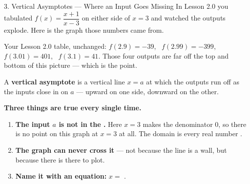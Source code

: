 \documentclass[10pt]{article}
\begin{document}
\boxguard[30]
\begin{notesbox}{3. Vertical Asymptotes --- Where an Input Goes Missing}
\small
In Lesson 2.0 you tabulated $f(x)=\dfrac{x+1}{x-3}$ on either side of $x=3$ and watched the outputs
explode. Here is the graph those numbers came from.

\begin{center}
\end{center}

\vspace{-4pt}
{\scriptsize Your Lesson 2.0 table, unchanged: $f(2.9)=-39$, \ $f(2.99)=-399$, \ $f(3.01)=401$, \
$f(3.1)=41$. Those four outputs are far off the top and bottom of this picture --- which is the point.}

\vspace{4pt}
A \textbf{vertical asymptote} is a vertical line $x=a$ at which the outputs run off
\blank{3.2cm} as the inputs close in on $a$ --- upward on one side, downward on the other.

\vspace{4pt}
\textbf{Three things are true every single time.}
\begin{enumerate}[leftmargin=1.5em, itemsep=3pt, topsep=3pt]
  \item \textbf{The input $a$ is not in the \blank{2.4cm}.} Here $x=3$ makes the denominator $0$, so
        there is no point on this graph at $x=3$ at all. The domain is every real number
        \blank{2.6cm}.
  \item \textbf{The graph can never cross it} --- not because the line is a wall, but because there
        is \blank{2.6cm} there to plot.
  \item \textbf{Name it with an equation:} $x=$ \blank{1.2cm}.
\end{enumerate}


\end{notesbox}
\end{document}

